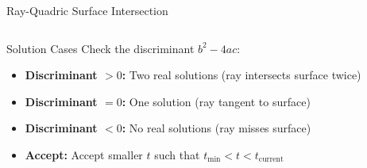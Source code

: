 \begin{frame}{Ray-Quadric Surface Intersection}
\begin{columns}
\begin{column}{0.35\textwidth}
        \end{column}
    \end{columns}
    
    \pause
    \begin{conceptbox}{Solution Cases}
        Check the discriminant $b^2 - 4ac$:
        \begin{itemize}
            \item \textbf{Discriminant $> 0$:} Two real solutions (ray intersects surface twice)
            \item \textbf{Discriminant $= 0$:} One solution (ray tangent to surface)  
            \item \textbf{Discriminant $< 0$:} No real solutions (ray misses surface)
            \item \textbf{Accept:} Accept smaller $t$ such that $t_{\text{min}} < t < t_{\text{current}}$
        \end{itemize}
    \end{conceptbox}
\end{frame}